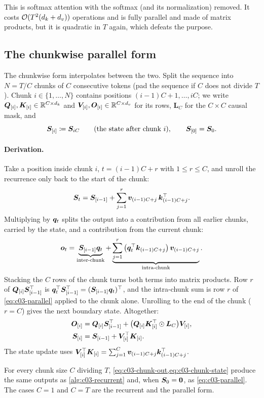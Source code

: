 This is softmax attention with the softmax (and its normalization) removed. It costs
$\mathcal{O}(T^2(d_k+d_v))$ operations and is fully parallel and made of matrix products, but it is
quadratic in $T$ again, which defeats the purpose.

\subsection{The chunkwise parallel form}

The chunkwise form interpolates between the two. Split the sequence into $N=T/C$ chunks of $C$
consecutive tokens (pad the sequence if $C$ does not divide $T$). Chunk $i\in\{1,\dots,N\}$
contains positions $(i-1)C+1,\dots,iC$; we write $\bm{Q}_{[i]},\bm{K}_{[i]}\in\mathbb{R}^{C\times d_k}$ and
$\bm{V}_{[i]},\bm{O}_{[i]}\in\mathbb{R}^{C\times d_v}$ for its rows, $\bm{L}_C$ for the $C\times C$ causal mask,
and
\[
  \bm{S}_{[i]}\coloneqq\bm{S}_{iC}\qquad(\text{the state after chunk } i),\qquad \bm{S}_{[0]}=\bm{S}_0 .
\]

\paragraph{Derivation.}
Take a position inside chunk $i$, $t=(i-1)C+r$ with $1\le r\le C$, and unroll the recurrence
only back to the start of the chunk:
\[
  \bm{S}_t=\bm{S}_{[i-1]}+\sum_{j=1}^{r}\bm{v}_{(i-1)C+j}\,\bm{k}_{(i-1)C+j}^{\top} .
\]
Multiplying by $\bm{q}_t$ splits the output into a contribution from all earlier chunks, carried by
the state, and a contribution from the current chunk:
\[
  \bm{o}_t=\underbrace{\bm{S}_{[i-1]}\bm{q}_t}_{\text{inter-chunk}}
  +\underbrace{\sum_{j=1}^{r}\big(\bm{q}_t^{\top}\bm{k}_{(i-1)C+j}\big)\,\bm{v}_{(i-1)C+j}}_{\text{intra-chunk}} .
\]
Stacking the $C$ rows of the chunk turns both terms into matrix products. Row $r$ of
$\bm{Q}_{[i]}\bm{S}_{[i-1]}^{\top}$ is $\bm{q}_t^{\top}\bm{S}_{[i-1]}^{\top}=(\bm{S}_{[i-1]}\bm{q}_t)^{\top}$, and the intra-chunk
sum is row $r$ of \cref{eq:c03-parallel} applied to the chunk alone. Unrolling to the end of the
chunk ($r=C$) gives the next boundary state. Altogether:
\begin{align}
  \bm{O}_{[i]}&=\bm{Q}_{[i]}\bm{S}_{[i-1]}^{\top}+\big(\bm{Q}_{[i]}\bm{K}_{[i]}^{\top}\odot\bm{L}_C\big)\bm{V}_{[i]},
  \label{eq:c03-chunk-out}\\
  \bm{S}_{[i]}&=\bm{S}_{[i-1]}+\bm{V}_{[i]}^{\top}\bm{K}_{[i]} .\label{eq:c03-chunk-state}
\end{align}
The state update uses $\bm{V}_{[i]}^{\top}\bm{K}_{[i]}=\sum_{j=1}^{C}\bm{v}_{(i-1)C+j}\bm{k}_{(i-1)C+j}^{\top}$.

\begin{proposition}\label{prop:c03-chunk-equiv}
For every chunk size $C$ dividing $T$, \cref{eq:c03-chunk-out,eq:c03-chunk-state} produce the
same outputs as \cref{alg:c03-recurrent} and, when $\bm{S}_0=\bm 0$, as \cref{eq:c03-parallel}.
The cases $C=1$ and $C=T$ are the recurrent and the parallel form.
\end{proposition}

